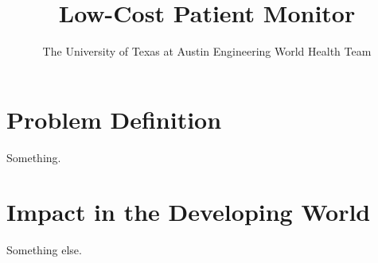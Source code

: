 \documentclass{article}
\title{Low-Cost Patient Monitor}
\author{The University of Texas at Austin Engineering World Health Team}
\begin{document}

\section{Problem Definition}
Something.
\cleardoublepage
\section{Impact in the Developing World}
Something else.
\end{document}
